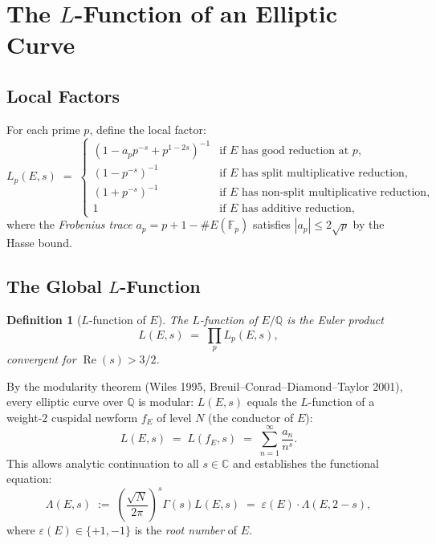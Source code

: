 \documentclass[12pt,a4paper]{article}
\newtheorem{definition}[theorem]{Definition}
\theoremstyle{remark}
\begin{document}
\section{The $L$-Function of an Elliptic Curve}

\subsection{Local Factors}

For each prime $p$, define the local factor:
\[
  L_p(E, s) \;=\;
  \begin{cases}
    (1 - a_p p^{-s} + p^{1-2s})^{-1} & \text{if } E \text{ has good reduction at } p, \\
    (1 - p^{-s})^{-1}                 & \text{if } E \text{ has split multiplicative reduction,} \\
    (1 + p^{-s})^{-1}                 & \text{if } E \text{ has non-split multiplicative reduction,} \\
    1                                  & \text{if } E \text{ has additive reduction,}
  \end{cases}
\]
where the \emph{Frobenius trace} $a_p = p + 1 - \#E(\mathbb{F}_p)$ satisfies
$|a_p| \leq 2\sqrt{p}$ by the Hasse bound.

\subsection{The Global $L$-Function}

\begin{definition}[$L$-function of $E$]
  The \emph{$L$-function} of $E/\mathbb{Q}$ is the Euler product
  \begin{equation}\label{eq:lfunction}
    L(E,s) \;=\; \prod_p L_p(E,s),
  \end{equation}
  convergent for $\operatorname{Re}(s) > 3/2$.
\end{definition}

By the modularity theorem (Wiles 1995, Breuil--Conrad--Diamond--Taylor 2001), every
elliptic curve over $\mathbb{Q}$ is modular: $L(E,s)$ equals the $L$-function of a
weight-$2$ cuspidal newform $f_E$ of level $N$ (the conductor of $E$):
\[
  L(E,s) \;=\; L(f_E,s) \;=\; \sum_{n=1}^\infty \frac{a_n}{n^s}.
\]
This allows analytic continuation to all $s \in \mathbb{C}$ and establishes the
functional equation:
\begin{equation}\label{eq:functional}
  \Lambda(E,s) \;:=\; \left(\frac{\sqrt{N}}{2\pi}\right)^s \Gamma(s) L(E,s)
  \;=\; \varepsilon(E) \cdot \Lambda(E, 2-s),
\end{equation}
where $\varepsilon(E) \in \{+1,-1\}$ is the \emph{root number} of $E$.
\end{document}
